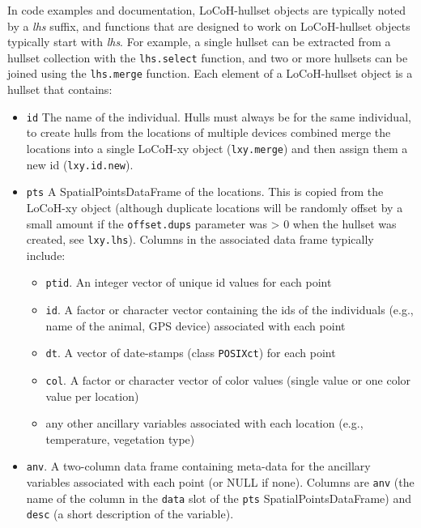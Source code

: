 \documentclass{article}
\begin{document}
In code examples and documentation, LoCoH-hullset objects are typically noted by a \textit{lhs} suffix, and functions that are designed to work on LoCoH-hullset objects typically start with \textit{lhs}. For example, a single hullset can be extracted from a hullset collection with the \texttt{lhs.select} function, and two or more hullsets can be joined using the \texttt{lhs.merge} function. Each element of a LoCoH-hullset object is a hullset that contains:
                                                                             
\begin{itemize}

  \item \texttt{id} The name of the individual. Hulls must always be for the same individual, to create hulls from the locations of multiple devices combined merge the locations into a single LoCoH-xy object (\texttt{lxy.merge}) and then assign them a new id (\texttt{lxy.id.new}).
  
  \item \texttt{pts} A SpatialPointsDataFrame of the locations. This is copied from the LoCoH-xy object (although duplicate locations will be randomly offset by a small amount if the \texttt{offset.dups} parameter was > 0 when the hullset was created, see \texttt{lxy.lhs}). Columns in the associated data frame typically include:

    \begin{itemize}
      \item \texttt{ptid}. An integer vector of unique id values for each point
      \item \texttt{id}. A factor or character vector containing the ids of the individuals (e.g., name of the animal, GPS device) associated with each point
      \item \texttt{dt}. A vector of date-stamps (class \texttt{POSIXct}) for each point
      \item \texttt{col}. A factor or character vector of color values (single value or one color value per location)
      \item any other ancillary variables associated with each location (e.g., temperature, vegetation type)
    \end{itemize}

  \item \texttt{anv}. A two-column data frame containing meta-data for the ancillary variables associated with each point (or NULL if none). Columns are \texttt{anv} (the name of the column in the \texttt{data} slot of the \texttt{pts} SpatialPointsDataFrame) and \texttt{desc} (a short description of the variable).


\end{itemize}
\end{document}
